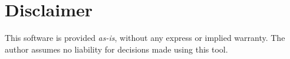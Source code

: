 \section{Disclaimer}

This software is provided \textit{as-is}, without any express or implied warranty. The author assumes no liability for decisions made using this tool.
